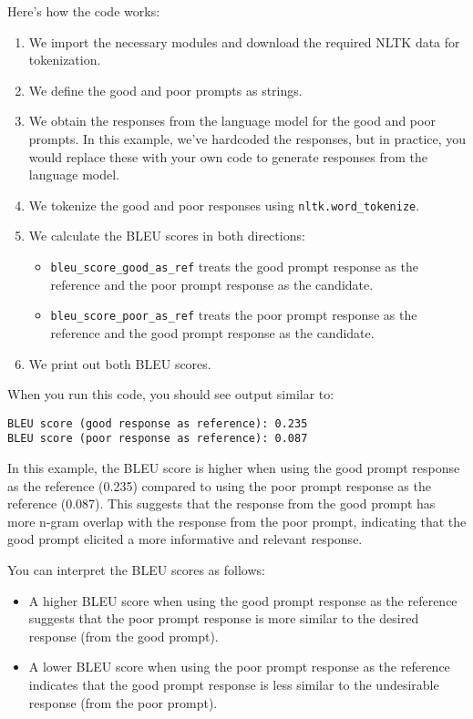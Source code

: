 \documentclass[
]{agujournal2019}
\providecommand{\tightlist}{%
  \setlength{\itemsep}{0pt}\setlength{\parskip}{0pt}}\usepackage{longtable,booktabs,array}
\begin{document}
Here's how the code works:

\begin{enumerate}
\def\labelenumi{\arabic{enumi}.}
\tightlist
\item
  We import the necessary modules and download the required NLTK data
  for tokenization.
\item
  We define the good and poor prompts as strings.
\item
  We obtain the responses from the language model for the good and poor
  prompts. In this example, we've hardcoded the responses, but in
  practice, you would replace these with your own code to generate
  responses from the language model.
\item
  We tokenize the good and poor responses using
  \texttt{nltk.word\_tokenize}.
\item
  We calculate the BLEU scores in both directions:

  \begin{itemize}
  \tightlist
  \item
    \texttt{bleu\_score\_good\_as\_ref} treats the good prompt response
    as the reference and the poor prompt response as the candidate.
  \item
    \texttt{bleu\_score\_poor\_as\_ref} treats the poor prompt response
    as the reference and the good prompt response as the candidate.
  \end{itemize}
\item
  We print out both BLEU scores.
\end{enumerate}

When you run this code, you should see output similar to:

\begin{verbatim}
BLEU score (good response as reference): 0.235
BLEU score (poor response as reference): 0.087
\end{verbatim}

In this example, the BLEU score is higher when using the good prompt
response as the reference (0.235) compared to using the poor prompt
response as the reference (0.087). This suggests that the response from
the good prompt has more n-gram overlap with the response from the poor
prompt, indicating that the good prompt elicited a more informative and
relevant response.

You can interpret the BLEU scores as follows:

\begin{itemize}
\tightlist
\item
  A higher BLEU score when using the good prompt response as the
  reference suggests that the poor prompt response is more similar to
  the desired response (from the good prompt).
\item
  A lower BLEU score when using the poor prompt response as the
  reference indicates that the good prompt response is less similar to
  the undesirable response (from the poor prompt).
\end{itemize}
\end{document}
